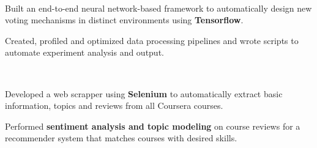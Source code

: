 \documentclass[]{dafirebanks-resume-openfont}
\begin{document}
\begin{minipage}[t]{0.66\textwidth}
\\
\hspace{85pt} 
\begin{tightemize}
	\item Built an end-to-end neural network-based framework to automatically design new voting mechanisms in distinct environments using \textbf{Tensorflow}. 
	\item Created, profiled and optimized data processing pipelines and wrote scripts to automate experiment analysis and output.
\end{tightemize}
\sectionsep







\\
\hspace{130pt} 
\begin{tightemize}
	\item Developed a web scrapper using \textbf{Selenium} to automatically extract basic information, topics and reviews from all Coursera courses.
	\item Performed \textbf{sentiment analysis and topic modeling} on course reviews for a recommender system that matches courses with desired skills. 
\end{tightemize}
\sectionsep


\end{minipage}
\end{document}
